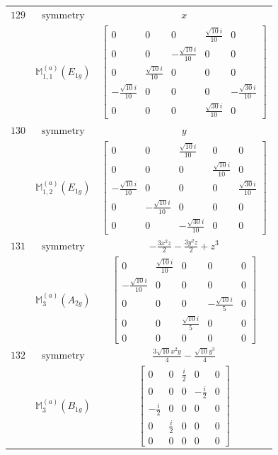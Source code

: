 \documentclass[fleqn,8pt,landscape]{jsarticle}
\begin{document}
\begin{longtable}{ccc}
$ 129 $ & $ \text{symmetry} $ & $ x $ \\
$  $ & $ \mathbb{M}_{1,1}^{(a)}(E_{1g}) $ & $ \begin{bmatrix} 0 & 0 & 0 & \frac{\sqrt{10} i}{10} & 0 \\ 0 & 0 & - \frac{\sqrt{10} i}{10} & 0 & 0 \\ 0 & \frac{\sqrt{10} i}{10} & 0 & 0 & 0 \\ - \frac{\sqrt{10} i}{10} & 0 & 0 & 0 & - \frac{\sqrt{30} i}{10} \\ 0 & 0 & 0 & \frac{\sqrt{30} i}{10} & 0 \end{bmatrix} $ \\ \hline
$ 130 $ & $ \text{symmetry} $ & $ y $ \\
$  $ & $ \mathbb{M}_{1,2}^{(a)}(E_{1g}) $ & $ \begin{bmatrix} 0 & 0 & \frac{\sqrt{10} i}{10} & 0 & 0 \\ 0 & 0 & 0 & \frac{\sqrt{10} i}{10} & 0 \\ - \frac{\sqrt{10} i}{10} & 0 & 0 & 0 & \frac{\sqrt{30} i}{10} \\ 0 & - \frac{\sqrt{10} i}{10} & 0 & 0 & 0 \\ 0 & 0 & - \frac{\sqrt{30} i}{10} & 0 & 0 \end{bmatrix} $ \\ \hline
$ 131 $ & $ \text{symmetry} $ & $ - \frac{3 x^{2} z}{2} - \frac{3 y^{2} z}{2} + z^{3} $ \\
$  $ & $ \mathbb{M}_{3}^{(a)}(A_{2g}) $ & $ \begin{bmatrix} 0 & \frac{\sqrt{10} i}{10} & 0 & 0 & 0 \\ - \frac{\sqrt{10} i}{10} & 0 & 0 & 0 & 0 \\ 0 & 0 & 0 & - \frac{\sqrt{10} i}{5} & 0 \\ 0 & 0 & \frac{\sqrt{10} i}{5} & 0 & 0 \\ 0 & 0 & 0 & 0 & 0 \end{bmatrix} $ \\ \hline
$ 132 $ & $ \text{symmetry} $ & $ \frac{3 \sqrt{10} x^{2} y}{4} - \frac{\sqrt{10} y^{3}}{4} $ \\
$  $ & $ \mathbb{M}_{3}^{(a)}(B_{1g}) $ & $ \begin{bmatrix} 0 & 0 & \frac{i}{2} & 0 & 0 \\ 0 & 0 & 0 & - \frac{i}{2} & 0 \\ - \frac{i}{2} & 0 & 0 & 0 & 0 \\ 0 & \frac{i}{2} & 0 & 0 & 0 \\ 0 & 0 & 0 & 0 & 0 \end{bmatrix} $ \\ \hline

\end{longtable}
\end{document}
